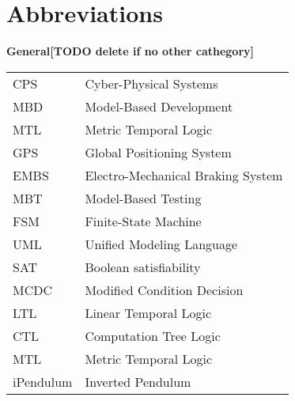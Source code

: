 \chapter*{Abbreviations}

{\bf General[TODO delete if no other cathegory]}\\

\begin{tabular}{ll}
CPS & Cyber-Physical Systems\\
MBD & Model-Based Development\\
MTL & Metric Temporal Logic\\
GPS & Global Positioning System\\
EMBS & Electro-Mechanical Braking System\\
MBT & Model-Based Testing\\
FSM & Finite-State Machine\\
UML & Unified Modeling Language\\
SAT & Boolean satisfiability\\
MCDC & Modified Condition Decision\\
LTL &  Linear Temporal Logic\\
CTL & Computation Tree Logic\\
MTL & Metric Temporal Logic\\
iPendulum & Inverted Pendulum
\end{tabular}
\vskip 1cm

\\

